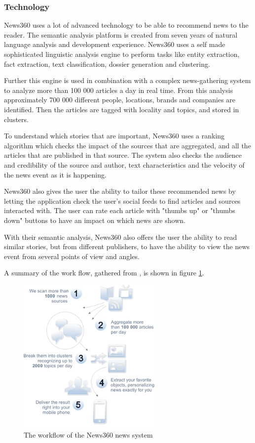 \subsubsection{Technology}
News360 uses a lot of advanced technology to be able to recommend news to the reader\cite{news360_technology}. The semantic analysis platform is created from seven years of natural language analysis and development experience. News360 uses a self made sophisticated linguistic analysis engine to perform tasks like entity extraction, fact extraction, text classification, dossier generation and clustering.

Further this engine is used in combination with a complex news-gathering system to analyze more than 100 000 articles a day in real time. From this analysis approximately 700 000 different people, locations, brands and companies are identified. Then the articles are tagged with locality and topics, and stored in clusters.

To understand which stories that are important, News360 uses a ranking algorithm which checks the impact of the sources that are aggregated, and all the articles that are published in that source. The system also checks the audience and credibility of the source and author, text characteristics and the velocity of the news event as it is happening.

News360 also gives the user the ability to tailor these recommended news by letting the application check the user's social feeds to find articles and sources interacted with. The user can rate each article with "thumbs up" or "thumbs down" buttons to have an impact on which news are shown.

With their semantic analysis, News360 also offers the user the ability to read similar stories, but from different publishers, to have the ability to view the news event from several points of view and angles.

A summary of the work flow, gathered from \cite{news360_technology}, is shown in figure \ref{tech_news360_workflow}.



\begin{figure}[!htbp]
\centering
\includegraphics[width=70mm]{GFX/tech/news360workflow.png}
\caption{The workflow of the News360 news system}
\label{tech_news360_workflow}
\end{figure}


